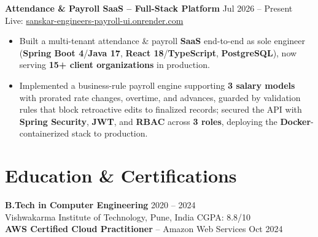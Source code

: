 \documentclass[a4paper,10pt]{article}
\begin{document}
\textbf{Attendance \& Payroll SaaS -- Full-Stack Platform} \hfill Jul 2026 -- Present \\
Live: \href{https://sanskar-engineers-payroll-ui.onrender.com/login}{sanskar-engineers-payroll-ui.onrender.com}
\begin{itemize}[leftmargin=*]
    \item Built a multi-tenant attendance \& payroll \textbf{SaaS} end-to-end as sole engineer (\textbf{Spring Boot 4}/\textbf{Java 17}, \textbf{React 18}/\textbf{TypeScript}, \textbf{PostgreSQL}), now serving \textbf{15+ client organizations} in production.
    \item Implemented a business-rule payroll engine supporting \textbf{3 salary models} with prorated rate changes, overtime, and advances, guarded by validation rules that block retroactive edits to finalized records; secured the API with \textbf{Spring Security}, \textbf{JWT}, and \textbf{RBAC} across \textbf{3 roles}, deploying the \textbf{Docker}-containerized stack to production.
\end{itemize}

\section*{Education \& Certifications}
\textbf{B.Tech in Computer Engineering} \hfill 2020 -- 2024 \\
Vishwakarma Institute of Technology, Pune, India \hfill CGPA: 8.8/10 \\
\textbf{AWS Certified Cloud Practitioner} -- Amazon Web Services \hfill Oct 2024
\end{document}
